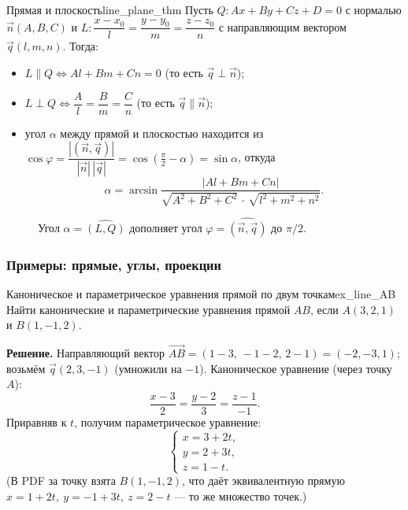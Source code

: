 \documentclass[12pt,a4paper]{article}
\begin{document}
\begin{theorem}{Прямая и плоскость}{line_plane_thm}
  Пусть $Q\colon Ax + By + Cz + D = 0$ с нормалью $\vec{n}(A,B,C)$ и
  $L\colon \dfrac{x-x_0}{l} = \dfrac{y-y_0}{m} = \dfrac{z-z_0}{n}$ с
  направляющим вектором $\vec{q}(l,m,n)$. Тогда:
  \begin{itemize}
    \item $L \parallel Q \iff Al + Bm + Cn = 0$
      (то есть $\vec{q} \perp \vec{n}$);
    \item $L \perp Q \iff \dfrac{A}{l} = \dfrac{B}{m} = \dfrac{C}{n}$
      (то есть $\vec{q} \parallel \vec{n}$);
    \item угол $\alpha$ между прямой и плоскостью находится из
      $\cos\varphi = \dfrac{|(\vec{n}, \vec{q})|}{|\vec{n}|\,|\vec{q}|}
      = \cos\!\left(\tfrac{\pi}{2} - \alpha\right) = \sin\alpha$,
      откуда
      \[
        \alpha = \arcsin\frac{|Al + Bm + Cn|}
        {\sqrt{A^2+B^2+C^2}\,\cdot\,\sqrt{l^2+m^2+n^2}}.
      \]
  \end{itemize}
\end{theorem}

\begin{figure}[h!]
  \centering
  \caption{Угол $\alpha=\widehat{(L,Q)}$ дополняет угол
  $\varphi=\widehat{(\vec{n},\vec{q})}$ до $\pi/2$.}
  \label{fig:line_plane}
\end{figure}

\subsubsection*{Примеры: прямые, углы, проекции}

\begin{definition}{Каноническое и параметрическое уравнения прямой по
  двум точкам}{ex_line_AB}
  Найти канонические и параметрические уравнения прямой $AB$, если
  $A(3,2,1)$ и $B(1,-1,2)$.

  \textbf{Решение.} Направляющий вектор
  $\overrightarrow{AB} = (1-3,\, -1-2,\, 2-1) = (-2,-3,1)$;
  возьмём $\vec{q}(2,3,-1)$ (умножили на $-1$).
  Каноническое уравнение (через точку $A$):
  \[
    \frac{x-3}{2} = \frac{y-2}{3} = \frac{z-1}{-1}.
  \]
  Приравняв к $t$, получим параметрическое уравнение:
  \[
    \begin{cases}
      x = 3 + 2t, \\ y = 2 + 3t, \\ z = 1 - t.
    \end{cases}
  \]
  (В PDF за точку взята $B(1,-1,2)$, что даёт эквивалентную прямую
  $x=1+2t,\ y=-1+3t,\ z=2-t$ --- то же множество точек.)
\end{definition}
\end{document}
